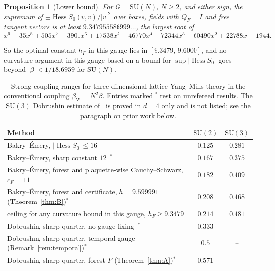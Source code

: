 \documentclass[11pt]{amsart}
\newtheorem{proposition}[theorem]{Proposition}
\theoremstyle{definition}
\theoremstyle{remark}
\newcommand{\Hess}{\operatorname{Hess}}
\newcommand{\SU}{\mathrm{SU}}
\begin{document}
\begin{proposition}[Lower bound]\label{prop:lower}
For $G=\SU(N)$, $N\ge2$, and either sign, the supremum of $\pm\Hess S_0(v,v)/|v|^2$ over boxes, fields with
$Q_F=I$ and free tangent vectors is at least $9.347955586999\ldots$, the largest root of
\[
x^9-35x^8+505x^7-3901x^6+17538x^5-46770x^4+72344x^3-60490x^2+22788x-1944 .
\]
\end{proposition}

So the optimal constant $h_F$ in this gauge lies in $[9.3479,\,9.6000]$, and no curvature argument in this gauge based on a bound for $\sup|\Hess S_0|$ goes
beyond $|\beta|<1/18.6959$ for $\SU(N)$.

\begin{table}[t]
\caption{Strong-coupling ranges for three-dimensional lattice Yang--Mills theory in the conventional coupling
$\beta_{\mathrm W}=N^2\beta$. Entries marked $^*$ rest on unrefereed results. The $\SU(3)$ Dobrushin estimate
of~\cite[Thm.~6]{BBL} is proved in $d=4$ only and is not listed; see the paragraph on prior work below.}
\label{tab:ranges}
\begin{tabular}{lcc}
\hline
Method & $\SU(2)$ & $\SU(3)$\\
\hline
Bakry--\'Emery, $|\Hess S_0|\le16$~\cite{SZZ} & $0.125$ & $0.281$\\
Bakry--\'Emery, sharp constant $12$~\cite{BB-zen}$^*$ & $0.167$ & $0.375$\\
Bakry--\'Emery, forest and plaquette-wise Cauchy--Schwarz, $c_F=11$~\cite{R} & $0.182$ & $0.409$\\
Bakry--\'Emery, forest and certificate, $h=9.599991$ (Theorem~\ref{thm:B})$^*$ & $0.208$ & $0.468$\\
\quad ceiling for any curvature bound in this gauge, $h_F\ge9.3479$ & $0.214$ & $0.481$\\
Dobrushin, sharp quarter, no gauge fixing~\cite{BB-zen}$^*$ & $0.333$ & --\\
Dobrushin, sharp quarter, temporal gauge (Remark~\ref{rem:temporal})$^*$ & $0.5$ & --\\
Dobrushin, sharp quarter, forest $F$ (Theorem~\ref{thm:A})$^*$ & $0.571$ & --\\
\hline
\end{tabular}
\end{table}
\end{document}
